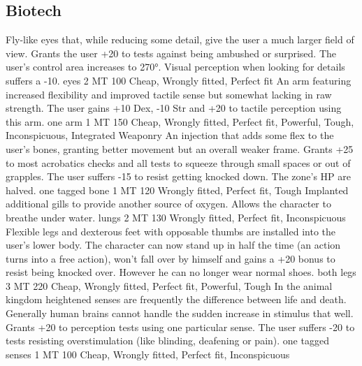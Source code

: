 \subsection{Biotech}
\vspace{10mm}
\begin{multicols}{2}
    {Fly-like eyes that, while reducing some detail, give the user a much larger field of view.}
    {Grants the user +20 to tests against being ambushed or surprised.
        The user's control area increases to 270°.
        Visual perception when looking for details suffers a -10.}
    {eyes}
    {2 MT}
    {100}
    {Cheap, Wrongly fitted, Perfect fit}
    {An arm featuring increased flexibility and improved tactile sense but somewhat lacking in raw strength.}
    {The user gains +10 Dex, -10 Str and +20 to tactile perception using this arm.}
    {one arm}
    {1 MT}
    {150}
    {Cheap, Wrongly fitted, Perfect fit, Powerful, Tough, Inconspicuous, Integrated Weaponry}
    {An injection that adds some flex to the user's bones, granting better movement but an overall weaker frame.}
    {Grants +25 to most acrobatics checks and all tests to squeeze through small spaces or out of grapples.
        The user suffers -15 to resist getting knocked down.
        The zone's HP are halved.}
    {one tagged bone}
    {1 MT}
    {120}
    {Wrongly fitted, Perfect fit, Tough}
    {Implanted additional gills to provide another source of oxygen.}
    {Allows the character to breathe under water.}
    {lungs}
    {2 MT}
    {130}
    {Wrongly fitted, Perfect fit, Inconspicuous}
    {Flexible legs and dexterous feet with opposable thumbs are installed into the user's lower body.}
    {The character can now stand up in half the time (an action turns into a free action),
        won't fall over by himself and gains a +20 bonus to resist being knocked over.
        However he can no longer wear normal shoes.}
    {both legs}
    {3 MT}
    {220}
    {Cheap, Wrongly fitted, Perfect fit, Powerful, Tough}
    {In the animal kingdom heightened senses are frequently the difference between life and death.
        Generally human brains cannot handle the sudden increase in stimulus that well.}
    {Grants +20 to perception tests using one particular sense.
        The user suffers -20 to tests resisting overstimulation (like blinding, deafening or pain).}
    {one tagged senses}
    {1 MT}
    {100}
    {Cheap, Wrongly fitted, Perfect fit, Inconspicuous}

\end{multicols}

